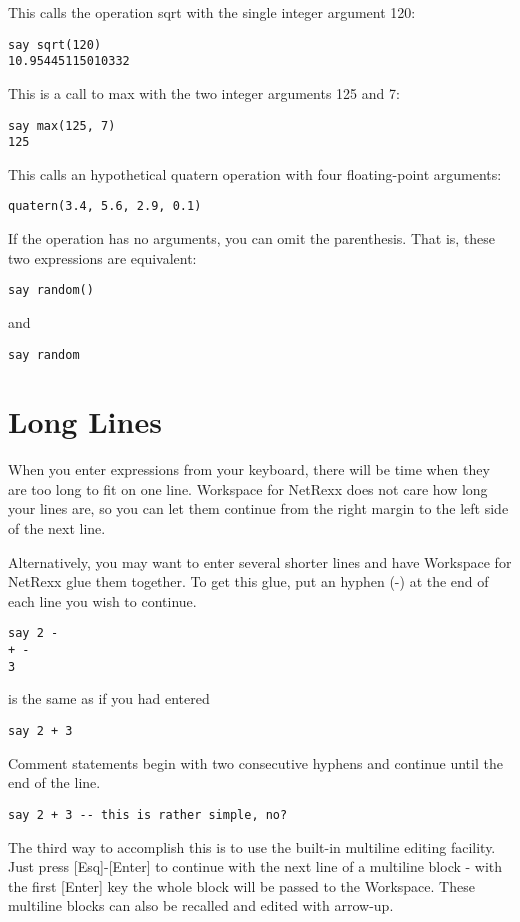 This calls the operation sqrt with the single integer argument 120:
\begin{verbatim}
say sqrt(120)
10.95445115010332
\end{verbatim}
This is a call to max with the two integer arguments 125 and 7:

\begin{verbatim}
say max(125, 7)
125
\end{verbatim}
This calls an hypothetical quatern operation with four floating-point arguments:

\begin{verbatim}
quatern(3.4, 5.6, 2.9, 0.1)
\end{verbatim}
If the operation has no arguments, you can omit the parenthesis. That is, these two expressions are equivalent:

\begin{verbatim}
say random()
\end{verbatim}
and

\begin{verbatim}
say random
\end{verbatim}

 \section{Long Lines}

When you enter expressions from your keyboard, there will be time when they are too long to fit on one line. Workspace for NetRexx does not care how long your lines are, so you can let them continue from the right margin to the left side of the next line.

Alternatively, you may want to enter several shorter lines and have Workspace for NetRexx glue them together. To get this glue, put an hyphen (-) at the end of each line you wish to continue.
\begin{verbatim}
say 2 -
+ -
3
\end{verbatim}
is the same as if you had entered

\begin{verbatim}
say 2 + 3
\end{verbatim}
Comment statements begin with two consecutive hyphens and continue until the end of the line.

\begin{verbatim}
say 2 + 3 -- this is rather simple, no?
\end{verbatim}

The third way to accomplish this is to use the built-in multiline
editing facility. Just press [Esq]-[Enter] to continue with the next
line of a multiline block - with the first [Enter] key the whole block
will be passed to the Workspace. These multiline blocks can also be
recalled and edited with arrow-up.

